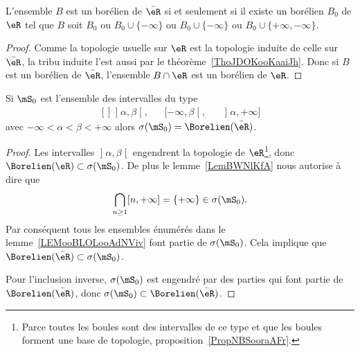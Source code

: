 \begin{lemma}       \label{LEMooBLOLooAdNViv}
	L'ensemble \( B\) est un borélien de \( \bar \eR\) si et seulement si il existe un borélien \( B_0\) de \( \eR\) tel que \( B\) soit \( B_0\) ou \( B_0\cup\{ -\infty \}\) ou \( B_0\cup\{ -\infty \}\) ou \( B_0\cup\{ +\infty,-\infty \}\).
\end{lemma}

\begin{proof}
	Comme la topologie usuelle sur \( \eR\) est la topologie induite de celle sur \( \bar \eR\), la tribu induite l'est aussi par le théorème~\ref{ThoJDOKooKaaiJh}. Donc si \( B\) est un borélien de \( \bar \eR\), l'ensemble \( B\cap \eR\) est un borélien de \( \eR\).
\end{proof}

\begin{lemma}       \label{LemooCRVJooQosHPq}
	Si \( \mS_0\) est l'ensemble des intervalles du type
	\begin{equation}
		\begin{aligned}[]
			\mathopen] \alpha , \beta \mathclose[, &  & \mathopen[ -\infty , \beta \mathclose[, &  & \mathopen] \alpha , +\infty \mathclose]
		\end{aligned}
	\end{equation}
	avec \( -\infty<\alpha<\beta<+\infty\) alors \( \sigma(\mS_0)=\Borelien(\bar\eR)\).
\end{lemma}

\begin{proof}
	Les intervalles \( \mathopen] \alpha , \beta \mathclose[\) engendrent la topologie de \( \eR\)\footnote{Parce toutes les boules sont des intervalles de ce type et que les boules forment une base de topologie, proposition~\ref{PropNBSooraAFr}.}, donc \( \Borelien(\eR)\subset\sigma(\mS_0)\). De plus le lemme~\ref{LemBWNlKfA} nous autorise à dire que
	\begin{equation}
		\bigcap_{n\geq 1}\mathopen[ n , +\infty \mathclose]=\{ +\infty \}\in\sigma(\mS_0).
	\end{equation}
	Par conséquent tous les ensembles énumérés dans le lemme~\ref{LEMooBLOLooAdNViv} font partie de \( \sigma(\mS_0)\). Cela implique que \( \Borelien(\bar\eR)\subset\sigma(\mS_0)\).

	Pour l'inclusion inverse, \( \sigma(\mS_0)\) est engendré par des parties qui font partie de \( \Borelien(\bar \eR)\), donc \( \sigma(\mS_0)\subset\Borelien(\bar \eR)\).
\end{proof}


